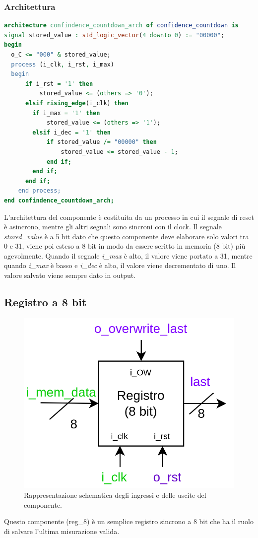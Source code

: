 \documentclass[12pt,a4paper]{scrartcl}
\begin{document}
    \subsubsection{Architettura}
    \begin{lstlisting}[language=VHDL]
architecture confindence_countdown_arch of confidence_countdown is
signal stored_value : std_logic_vector(4 downto 0) := "00000";
begin
  o_C <= "000" & stored_value;
  process (i_clk, i_rst, i_max)
  begin
      if i_rst = '1' then
          stored_value <= (others => '0');
      elsif rising_edge(i_clk) then
        if i_max = '1' then
            stored_value <= (others => '1');
        elsif i_dec = '1' then
            if stored_value /= "00000" then
                stored_value <= stored_value - 1;
            end if;
        end if;
      end if;
    end process;
end confindence_countdown_arch;
    \end{lstlisting}
    L'architettura del componente è costituita da un processo in cui il segnale di reset è asincrono, mentre gli altri segnali sono sincroni con il clock. \newline
    Il segnale \textit{stored\_value} è a 5 bit dato che questo componente deve elaborare solo valori tra 0 e 31, viene poi esteso a 8 bit in modo da essere scritto in memoria (8 bit) più agevolmente. \newline
    Quando il segnale \textit{i\_max} è alto, il valore viene portato a 31, mentre quando \textit{i\_max} è basso e \textit{i\_dec} è alto, il valore viene decrementato di uno. \newline Il valore salvato viene sempre dato in output.
    \newpage
    \subsection{Registro a 8 bit}
        \begin{figure}[htbp]
          \centering
          \includegraphics[width=0.6\linewidth]{schema-reg_8.drawio.png}
          \caption{Rappresentazione schematica degli ingressi e delle uscite del componente.}
          \label{fig:componente}
        \end{figure}
    Questo componente (reg\_8) è un semplice registro sincrono a 8 bit che ha il ruolo di salvare l'ultima misurazione valida.
\end{document}
